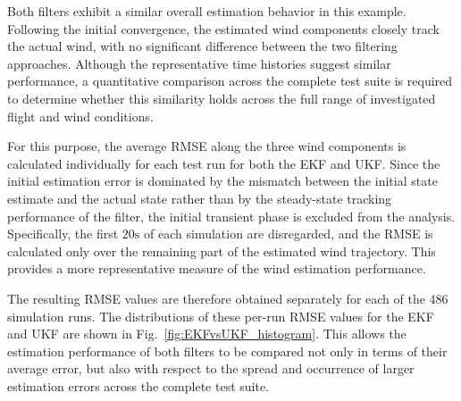 Both filters exhibit a similar overall estimation behavior in this example. Following the initial convergence, the estimated wind components closely track the actual wind, with no significant difference between the two filtering approaches.
Although the representative time histories suggest similar performance, a quantitative comparison across the complete test suite is required to determine whether this similarity holds across the full range of investigated flight and wind conditions. 

For this purpose, the average RMSE along the three wind components is calculated individually for each test run for both the EKF and UKF. Since the initial estimation error is dominated by the mismatch between the initial state estimate and the actual state rather than by the steady-state tracking performance of the filter, the initial transient phase is excluded from the analysis. Specifically, the first $20 \mathrm{s}$ of each simulation are disregarded, and the RMSE is calculated only over the remaining part of the estimated wind trajectory. This provides a more representative measure of the wind estimation performance.

The resulting RMSE values are therefore obtained separately for each of the 486 simulation runs. The distributions of these per-run RMSE values for the EKF and UKF are shown in Fig.~\ref{fig:EKFvsUKF_histogram}. This allows the estimation performance of both filters to be compared not only in terms of their average error, but also with respect to the spread and occurrence of larger estimation errors across the complete test suite.



